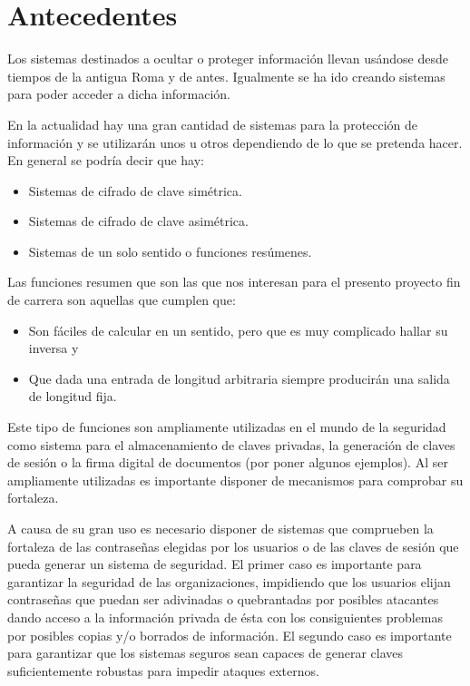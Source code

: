 \chapter{Antecedentes}

Los sistemas destinados a ocultar o proteger información llevan usándose desde tiempos de la antigua Roma y de antes. Igualmente se ha ido creando sistemas para poder acceder a dicha información.

En la actualidad hay una gran cantidad de sistemas para la protección de información y se utilizarán unos u otros dependiendo de lo que se pretenda hacer. En general se podría decir que hay:
\begin{itemize}
	\item Sistemas de cifrado de clave simétrica.
	\item Sistemas de cifrado de clave asimétrica.
	\item Sistemas de un solo sentido o funciones resúmenes.	
\end{itemize}

Las funciones resumen que son las que nos interesan para el presento proyecto fin de carrera son aquellas que cumplen que:

\begin{itemize}
	\item Son fáciles de calcular en un sentido, pero que es muy complicado hallar su inversa y
	\item Que dada una entrada de longitud arbitraria siempre producirán una salida de longitud fija.	
\end{itemize}

Este tipo de funciones son ampliamente utilizadas en el mundo de la seguridad como sistema para el almacenamiento de claves privadas, la generación de claves de sesión o la firma digital de documentos (por poner algunos ejemplos). Al ser ampliamente utilizadas es importante disponer de mecanismos para comprobar su fortaleza.

A causa de su gran uso es necesario disponer de sistemas que comprueben la fortaleza de las contraseñas elegidas por los usuarios o de las claves de sesión que pueda generar un sistema de seguridad. El primer caso es importante para garantizar la seguridad de las organizaciones, impidiendo que los usuarios elijan contraseñas que puedan ser adivinadas o quebrantadas por posibles atacantes dando acceso a la información privada de ésta con los consiguientes problemas por posibles copias y/o borrados de información. El segundo caso es importante para garantizar que los sistemas seguros sean capaces de generar claves suficientemente robustas para impedir ataques externos.

